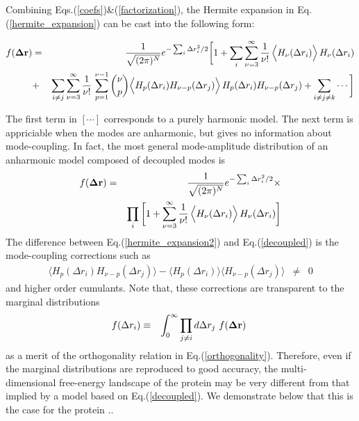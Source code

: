 \documentclass{article}
\begin{document}
Combining Eqs.(\ref{coefs})\&(\ref{factorization}), the Hermite
expansion in Eq.(\ref{hermite_expansion}) can be cast into the
following form:
\begin{widetext}
\begin{eqnarray}
\label{hermite_expansion2}
f({\bf\Delta r}) &=& \frac{1}{\sqrt{(2\pi)^N}} e^{ -\sum_i \Delta
  r_i^2/2} \bigg[ 1 + \sum_i\sum_{\nu=3}^\infty
  \frac{1}{\nu!}\, \Big\langle
  H_\nu(\Delta r_i)\Big\rangle\,H_\nu(\Delta r_i) \nonumber \\
&+&  \sum_{i\ne j}\sum_{\nu=3}^\infty
  \frac{1}{\nu!}\,\sum_{p=1}^{\nu-1} {\nu\choose p} \Big\langle
  H_p(\Delta r_i)H_{\nu-p}(\Delta r_j)\Big\rangle\,H_p(\Delta r_i)H_{\nu-p}(\Delta r_j) + \sum_{i\ne j\ne k} \cdots \bigg]
\end{eqnarray}
\end{widetext}
The first term in $[\cdots]$ corresponds to a purely harmonic
model. The next term is appriciable when the modes are anharmonic, but
gives no information about mode-coupling. In fact, the most general
mode-amplitude distribution of an anharmonic model composed of
decoupled modes is
\begin{eqnarray}
\label{decoupled}
f({\bf\Delta r}) &=& \frac{1}{\sqrt{(2\pi)^N}} e^{ -\sum_i \Delta
  r_i^2/2}\times \nonumber \\ && \prod_i \bigg[ 1 + \sum_{\nu=3}^\infty
  \frac{1}{\nu!}\, \Big\langle
  H_\nu(\Delta r_i)\Big\rangle\,H_\nu(\Delta r_i)\bigg]
\end{eqnarray}
The difference between Eq.(\ref{hermite_expansion2}) and
Eq.(\ref{decoupled}) is the mode-coupling corrections such as
\begin{eqnarray}
\langle H_p(\Delta r_i)H_{\nu-p}(\Delta r_j)\rangle - \langle
H_p(\Delta r_i)\rangle\langle H_{\nu-p}(\Delta r_j)\rangle &\neq& 0 \nonumber
\end{eqnarray}
and higher order cumulants. Note that, these corrections are transparent to the
marginal distributions
\begin{eqnarray}
\label{marginal}
f(\Delta r_i) &\equiv& \int_0^\infty \prod_{j\ne i}d\Delta r_j\ f({\bf\Delta r})\ 
\end{eqnarray}
as a merit of the orthogonality relation in
Eq.(\ref{orthogonality}). Therefore, even if the marginal
distributions are reproduced to good accuracy, the multi-dimensional
free-energy landscape of the protein may be very different from that
implied by a model based on Eq.(\ref{decoupled}). We demonstrate below
that this is the case for the protein ..

\begin{thebibliography}{99}

\bibitem{Flory}{Flory, 1976.}

\end{thebibliography}
\end{document}
